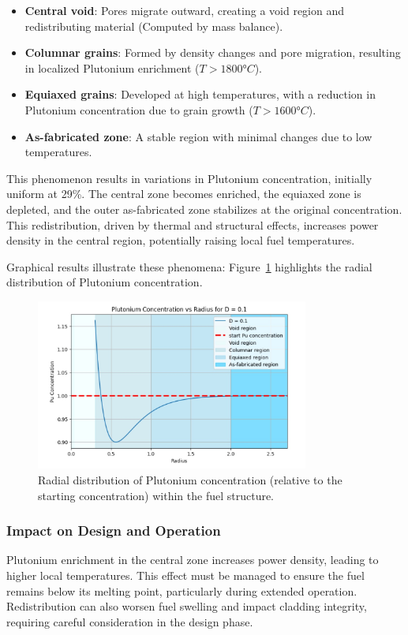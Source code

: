 \documentclass[11pt,a4paper,twoside]{article}
\begin{document}
\begin{itemize}
    \item \textbf{Central void}: Pores migrate outward, creating a void region and redistributing material (Computed by mass balance).
    \item \textbf{Columnar grains}: Formed by density changes and pore migration, resulting in localized Plutonium enrichment ($T > 1800° C$).
    \item \textbf{Equiaxed grains}: Developed at high temperatures, with a reduction in Plutonium concentration due to grain growth ($T > 1600° C$).
    \item \textbf{As-fabricated zone}: A stable region with minimal changes due to low temperatures.
\end{itemize}

This phenomenon results in variations in Plutonium concentration, initially uniform at 29\%. The central zone becomes enriched, the equiaxed zone is depleted, and the outer as-fabricated zone stabilizes at the original concentration. This redistribution, driven by thermal and structural effects, increases power density in the central region, potentially raising local fuel temperatures.

Graphical results illustrate these phenomena: Figure~\ref{fig:Pu_Profile} highlights the radial distribution of Plutonium concentration.

\begin{figure}[H]
\centering
\includegraphics[width=0.8\textwidth]{Pu_redistribution_profile.jpg}
\caption{Radial distribution of Plutonium concentration (relative to the starting concentration) within the fuel structure.}
\label{fig:Pu_Profile}
\end{figure}

\subsubsection*{Impact on Design and Operation}
Plutonium enrichment in the central zone increases power density, leading to higher local temperatures. 
This effect must be managed to ensure the fuel remains below its melting point, particularly during extended operation. 
Redistribution can also worsen fuel swelling and impact cladding integrity, requiring careful consideration in the design phase.
\end{document}
